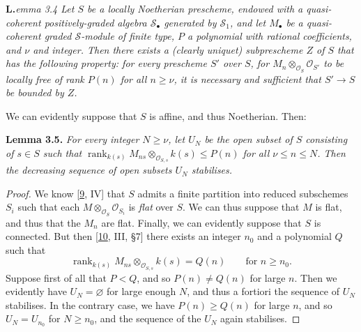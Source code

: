 \documentclass{article}
\newenvironment{itenv}[1]
  {\phantomsection\par\smallskip\noindent\textbf{#1.}\itshape}
  {\par\smallskip}
\newcommand{\oldpage}[1]{\marginpar{\footnotesize$\Big\vert$ \textit{p.~#1}}}
\theoremstyle{definition}
\theoremstyle{definition}
\theoremstyle{definition}
\theoremstyle{definition}
\theoremstyle{remark}
\begin{document}
\leavevmode{}%
\begin{itenv}Lemma 3.4
Let \(S\) be a locally Noetherian prescheme, endowed with a quasi-coherent positively-graded algebra \({\mathcal{S}}_\bullet\) generated by \({\mathcal{S}}_1\), and let \(M_\bullet\) be a quasi-coherent graded \({\mathcal{S}}\)-module of finite type, \(P\) a polynomial with rational coefficients, and \(\nu\) and integer.
Then there exists a (clearly uniquet) subprescheme \(Z\) of \(S\) that has the following property:
for every prescheme \(S'\) over \(S\), for \(M_n\otimes_{{\mathscr{O}}_S}{\mathscr{O}}_{S'}\) to be locally free of rank \(P(n)\) for all \(n\geqslant\nu\), it is necessary and sufficient that \(S'\to S\) be bounded by \(Z\).

\end{itenv}

\oldpage{221-15}We can evidently suppose that \(S\) is affine, and thus Noetherian.
Then:

\leavevmode{}%
\begin{itenv}{Lemma 3.5}
For every integer \(N\geqslant\nu\), let \(U_N\) be the open subset of \(S\) consisting of \(s\in S\) such that \(\operatorname{rank}_{k(s)}M_{ns}\otimes_{{\mathscr{O}}_{S,s}}k(s)\leqslant P(n)\) for all \(\nu\leqslant n\leqslant N\).
Then the decreasing sequence of open subsets \(U_N\) stabilises.

\end{itenv}

\begin{proof}
We know {[}\protect\hyperlink{ref-Gro1960b}{9}, IV{]} that \(S\) admits a finite partition into reduced subschemes \(S_i\) such that each \(M\otimes_{{\mathscr{O}}_S}{\mathscr{O}}_{S_i}\) is \emph{flat} over \(S\).
We can thus suppose that \(M\) is flat, and thus that the \(M_n\) are flat.
Finally, we can evidently suppose that \(S\) is connected.
But then {[}\protect\hyperlink{ref-GD1960}{10}, III, §7{]} there exists an integer \(n_0\) and a polynomial \(Q\) such that
\[
  \operatorname{rank}_{k(s)}M_{ns}\otimes_{{\mathscr{O}}_{S,s}}k(s) = Q(n)
  \qquad\text{for }n\geqslant n_0.
\]
Suppose first of all that \(P<Q\), and so \(P(n)\neq Q(n)\) for large \(n\).
Then we evidently have \(U_N=\varnothing\) for large enough \(N\), and thus a fortiori the sequence of \(U_N\) stabilises.
In the contrary case, we have \(P(n)\geqslant Q(n)\) for large \(n\), and so \(U_N=U_{n_0}\) for \(N\geqslant n_0\), and the sequence of the \(U_N\) again stabilises.
\end{proof}
\end{document}
